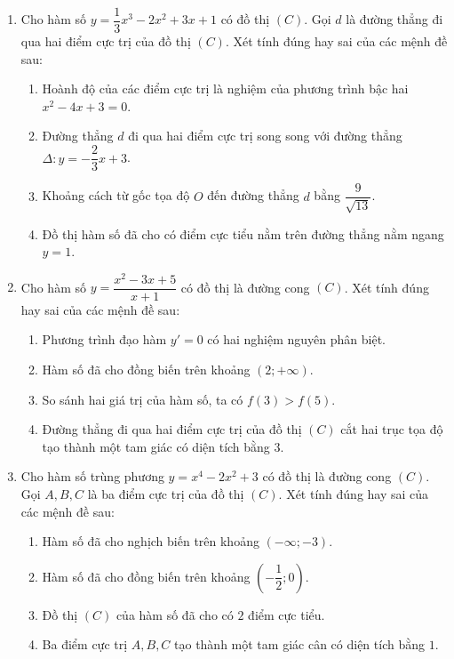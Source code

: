 \documentclass[12pt]{article}
\begin{document}
\begin{enumerate}[label=\textbf{Câu \arabic*.}]
		\item Cho hàm số $y = \dfrac{1}{3}x^3 - 2x^2 + 3x + 1$ có đồ thị $(C)$. Gọi $d$ là đường thẳng đi qua hai điểm cực trị của đồ thị $(C)$. Xét tính đúng hay sai của các mệnh đề sau:
		\begin{enumerate}[label=\alph*)]
			\item Hoành độ của các điểm cực trị là nghiệm của phương trình bậc hai $x^2 - 4x + 3 = 0$.
			\item Đường thẳng $d$ đi qua hai điểm cực trị song song với đường thẳng $\Delta: y = -\dfrac{2}{3}x + 3$.
			\item Khoảng cách từ gốc tọa độ $O$ đến đường thẳng $d$ bằng $\dfrac{9}{\sqrt{13}}$.
			\item Đồ thị hàm số đã cho có điểm cực tiểu nằm trên đường thẳng nằm ngang $y = 1$.
		\end{enumerate}
		
		\item Cho hàm số $y = \dfrac{x^2 - 3x + 5}{x + 1}$ có đồ thị là đường cong $(C)$. Xét tính đúng hay sai của các mệnh đề sau:
		\begin{enumerate}[label=\alph*)]
			\item Phương trình đạo hàm $y' = 0$ có hai nghiệm nguyên phân biệt.
			\item Hàm số đã cho đồng biến trên khoảng $(2; +\infty)$.
			\item So sánh hai giá trị của hàm số, ta có $f(3) > f(5)$.
			\item Đường thẳng đi qua hai điểm cực trị của đồ thị $(C)$ cắt hai trục tọa độ tạo thành một tam giác có diện tích bằng $3$.
		\end{enumerate}
		
		\item Cho hàm số trùng phương $y = x^4 - 2x^2 + 3$ có đồ thị là đường cong $(C)$. Gọi $A, B, C$ là ba điểm cực trị của đồ thị $(C)$. Xét tính đúng hay sai của các mệnh đề sau:
		\begin{enumerate}[label=\alph*)]
			\item Hàm số đã cho nghịch biến trên khoảng $(-\infty; -3)$.
			\item Hàm số đã cho đồng biến trên khoảng $\left(-\dfrac{1}{2}; 0\right)$.
			\item Đồ thị $(C)$ của hàm số đã cho có $2$ điểm cực tiểu.
			\item Ba điểm cực trị $A, B, C$ tạo thành một tam giác cân có diện tích bằng $1$.
		\end{enumerate}
		

\end{enumerate}
\end{document}
